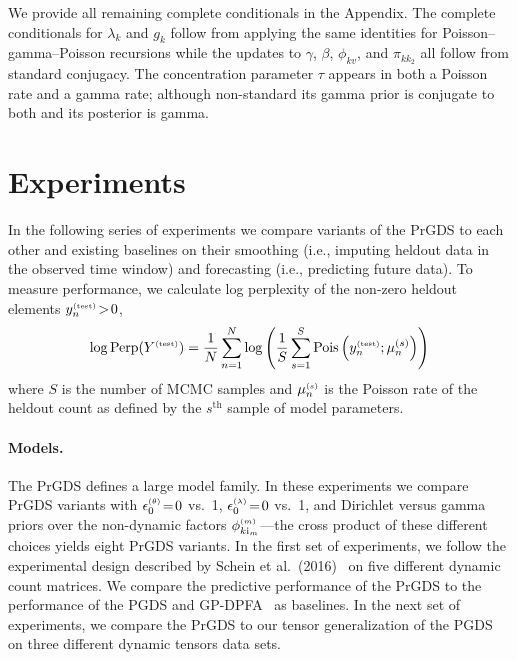\documentclass{article}
\begin{document}
We provide all remaining complete conditionals in the Appendix. The complete conditionals for $\lambda_k$ and $g_k$ follow from applying the same identities for Poisson--gamma--Poisson recursions while the updates to $\gamma$, $\beta$, $\phi_{kv}$, and $\pi_{kk_2}$ all follow from standard conjugacy. The concentration parameter $\tau$ appears in both a Poisson rate and a gamma rate; although non-standard its gamma prior is conjugate to both and its posterior is gamma.~

\section{Experiments}
\label{sec:experiments}
In the following series of experiments we compare variants of the PrGDS to each other and existing baselines on their smoothing (i.e., imputing heldout data in the observed time window) and forecasting (i.e., predicting future data). To measure performance, we calculate log perplexity of the non-zero heldout elements $y^{\mathsmaller{(\textrm{test})}}_n \!>\! 0$,~
\begin{equation}
\label{eq:perplexity}
\log \textrm{Perp}(Y^{\mathsmaller{(\textrm{test})}}) = \frac{1}{N}\sum_{n=1}^N \log \left(\frac{1}{S}\sum_{s=1}^S \textrm{Pois}\left(y^{\mathsmaller{(\textrm{test})}}_n; \mu_n^{(s)}\right) \right)
\end{equation}
where $S$ is the number of MCMC samples and $\mu_n^{\mathsmaller{(s)}}$ is the Poisson rate of the heldout count as defined by the $s^{\textrm{th}}$ sample of model parameters.

\paragraph{Models.} The PrGDS defines a large model family. In these experiments we compare PrGDS variants with $\epstheta \teq 0$ vs.\ 1,  $\epslambda  \teq 0$ vs.\ 1, and Dirichlet versus gamma priors over the non-dynamic factors $\phi^{\mathsmaller{(m)}}_{k \osub_m}$---the cross product of these different choices yields eight PrGDS variants. In the first set of experiments, we follow the experimental design described by Schein et al.~(2016)~\cite{schein2016poisson} on five different dynamic count matrices. We compare the predictive performance of the PrGDS to the performance of the PGDS and GP-DPFA~\cite{acharya2015nonparametric} as baselines. In the next set of experiments, we compare the PrGDS to our tensor generalization of the PGDS on three different dynamic tensors data sets.~
\end{document}
